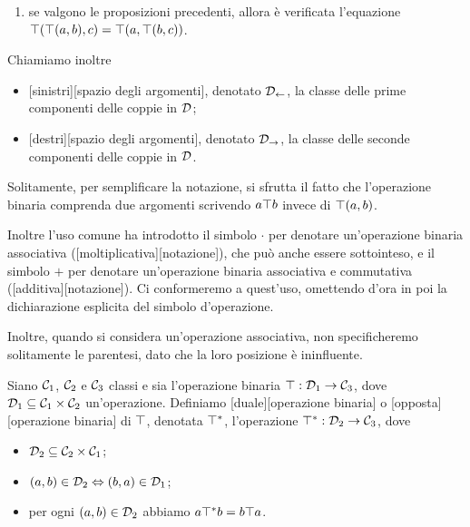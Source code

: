 \begin{Definition}
\begin{itemize}
\begin{enumerate}
\begin{itemize}
				\item $(a,b) \in \Domain$ e $(b,c) \in \Domain$;
			\end{itemize}
			\item se valgono le proposizioni precedenti, allora \`e verificata l'equazione $\top(\top(a,b),c) = \top(a,\top(b,c))$.
		\end{enumerate}
	\end{itemize}
	Chiamiamo inoltre
	\begin{itemize}
		\item {}[sinistri][spazio degli argomenti], denotato $\mathcal{D}_\leftarrow$, la classe delle prime componenti delle coppie in $\mathcal{D}$;
		\item {}[destri][spazio degli argomenti], denotato $\mathcal{D}_\rightarrow$, la classe delle seconde componenti delle coppie in $\mathcal{D}$.
	\end{itemize}
\end{Definition}
\par Solitamente, per semplificare la notazione, si sfrutta il fatto che l'operazione binaria comprenda due argomenti scrivendo $a \top b$ invece di $\top(a,b)$.
\par Inoltre l'uso comune ha introdotto il simbolo $\cdot$ per denotare un'operazione binaria associativa ([moltiplicativa][notazione]), che pu\`o anche essere sottointeso, e il simbolo $+$ per denotare un'operazione binaria associativa e commutativa ([additiva][notazione]). Ci conformeremo a quest'uso, omettendo d'ora in poi la dichiarazione esplicita del simbolo d'operazione.
\par Inoltre, quando si considera un'operazione associativa, non specificheremo solitamente le parentesi, dato che la loro posizione \`e ininfluente.
\begin{Definition}
	Siano $\mathcal{C}_1$, $\mathcal{C}_2$ e $\mathcal{C}_3$ classi e sia l'operazione binaria $\top: \mathcal{D}_1 \rightarrow \mathcal{C}_3$, dove $\mathcal{D}_1 \subseteq \mathcal{C}_1 \times \mathcal{C}_2$ un'operazione. Definiamo [duale][operazione binaria] o [opposta][operazione binaria] di $\top$, denotata ${{\top}^*}$, l'operazione ${{\top}^*}: \mathcal{D}_2 \rightarrow \mathcal{C}_3$, dove
	\begin{itemize}
		\item $\mathcal{D}_2 \subseteq \mathcal{C}_2 \times \mathcal{C}_1$;
		\item $(a,b) \in \mathcal{D}_2 \Leftrightarrow (b,a) \in \mathcal{D}_1$;
		\item per ogni $(a,b) \in \mathcal{D}_2$ abbiamo $a {{\top}^*} b = b \top a$.
	\end{itemize}
\end{Definition}
